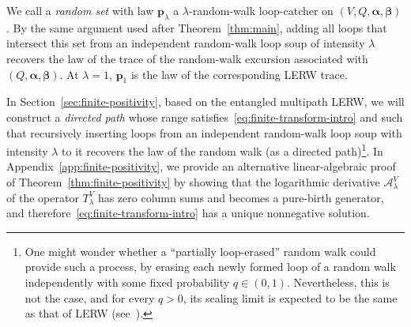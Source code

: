 \documentclass[11pt]{article}
\numberwithin{equation}{section}
\newcommand{\1}{\mathbf{1}}
\newcommand{\balpha}{\boldsymbol{\alpha}}
\newcommand{\bbeta}{\boldsymbol{\beta}}
\newcommand{\bp}{\mathbf p}
\begin{document}
We call a \emph{random set} with law $\bp_\lambda$ a \(\lambda\)-random-walk loop-catcher on $(V,Q,\balpha,\bbeta)$. By the same argument used
after Theorem~\ref{thm:main}, adding all loops that intersect this set
from an independent random-walk loop soup of intensity $\lambda$ recovers the law of the trace of the random-walk excursion associated with
$(Q,\balpha,\bbeta)$.
At $\lambda=1$, $\bp_1$ is the law of the corresponding LERW trace.  

In Section~\ref{sec:finite-positivity}, based on the entangled multipath LERW, we will construct a \emph{directed path} whose range satisfies~\eqref{eq:finite-transform-intro} and such that recursively inserting loops from an independent random-walk loop soup with intensity $\lambda$ to it recovers the law of the random walk (as a directed path)\footnote{One might wonder whether a ``partially loop-erased'' random walk could provide such a process, by erasing each newly formed loop of a random walk independently with some fixed probability \(q\in(0,1)\). Nevertheless, this is not the case, and for every \(q>0\), its scaling limit is expected to be the same as that of LERW (see~\cite[the end of Section 7]{wiese-fedorenko-lerw-field}).}. In Appendix~\ref{app:finite-positivity}, we provide an alternative linear-algebraic proof of Theorem~\ref{thm:finite-positivity} by showing that the logarithmic derivative $\mathcal{A}_\lambda^V$ of the operator $T_\lambda^V$ has zero column sums and becomes a pure-birth generator, and therefore~\eqref{eq:finite-transform-intro} has a unique nonnegative solution.
\end{document}
